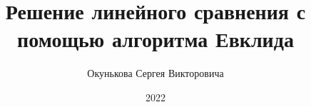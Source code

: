 \documentclass[spec, och, labwork]{shiza}
\begin{document}
\chair{}

\title{Решение линейного сравнения с помощью алгоритма Евклида}






\author{Окунькова Сергея Викторовича}








\date{2022}

\maketitle

\end{document}
